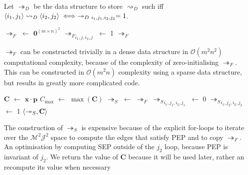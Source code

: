 \begin{definition}
	Let $\twoheadrightarrow_D$ be the data structure to store $\rightsquigarrow_D$ such iff $\pair{i_1}{j_1}\rightsquigarrow_D\pair{i_2}{j_2}\iff\twoheadrightarrow_{D\ i_1,j_1,i_2,j_2}=1$.
\end{definition}

\begin{algorithm}[H]
	\caption{}
	\begin{algorithmic}[1]
			\State $\twoheadrightarrow_F$ $\gets$ $\mathbf{0}^{(m\times n)^2}$
							\State ${\twoheadrightarrow_F}_{i_1,j,i_2,j}$ $\gets$ 1
						\EndIf
					\EndFor
				\EndFor
			\EndFor
			\State \Return $\twoheadrightarrow_F$
		\EndFunction
	\end{algorithmic}
\end{algorithm}

$\twoheadrightarrow_F$ can be constructed trivially in a dense data structure in $\mathcal{O}(m^2n^2)$ computational complexity, because of the complexity of zero-initialising $\twoheadrightarrow_F$. This can be constructed in $\mathcal{O}(m^2n)$ complexity using a sparse data structure, but results in greatly more complicated code.

\begin{algorithm}[H]
	\caption{}
	\begin{algorithmic}[1]
			\State $\mathbf{C}$ $\gets$ $\mathbf{x}\cdot\mathbf{p}$
			\State $C_{\max}$ $\gets$ $\max(\mathbf{C})$
			\State $\twoheadrightarrow_S$ $\gets$ $\twoheadrightarrow_F$
									\State ${\twoheadrightarrow_S}_{i_1,j_1,i_2,j_1}$ $\gets$ 0
								\EndIf
										\State ${\twoheadrightarrow_S}_{i_1,j_2,i_2,j_2}$ $\gets$ 1
									\EndIf
								\EndFor
							\EndFor
						\EndIf
					\EndFor
				\EndIf
			\EndFor
			\State \Return $\langle{\twoheadrightarrow_S},{\mathbf{C}}\rangle$
		\EndFunction
	\end{algorithmic}
\end{algorithm}

The construction of $\twoheadrightarrow_S$ is expensive because of the explicit for-loops to iterate over the $\mathcal{M}^2\mathcal{J}^2$ space to compute the edges that satisfy PEP and to copy $\twoheadrightarrow_F$. An optimisation by computing SEP outside of the $j_2$ loop, because PEP is invariant of $j_2$. We return the value of $\mathbf{C}$ because it will be used later, rather an recompute its value when necessary

